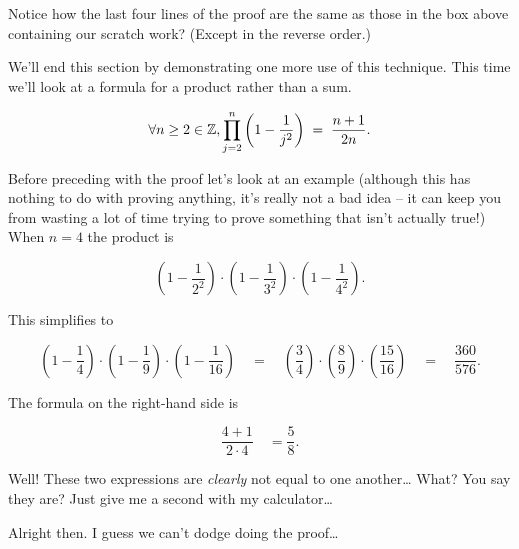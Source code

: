 Notice how the last four lines of the proof are the same as those in
the box above containing our scratch work?  (Except in the reverse order.)

We'll end this section by demonstrating one more use of this technique.
This time we'll look at a formula for a product rather than a sum.

\begin{thm} $$\forall n \geq 2 \in {\mathbb Z}, \prod_{j=2}^n \left( 1 - \frac{1}{j^2} \right) \;  = \; \frac{n+1}{2n}. $$
\end{thm}

Before preceding with the proof let's look at an example (although this 
has nothing to do with proving anything, it's really not a bad idea -- it can
keep you from wasting a lot of time trying to prove something that isn't 
actually true!)  When $n = 4$ the product is

\[  \left(1-\frac{1}{2^2}\right) \cdot \left(1-\frac{1}{3^2}\right) \cdot \left(1-\frac{1}{4^2}\right). 
\]

This simplifies to

\[ \left( 1-\frac{1}{4} \right) \cdot \left( 1-\frac{1}{9} \right) \cdot 
\left( 1-\frac{1}{16} \right) \quad = \quad \left( \frac{3}{4} \right) \cdot \left( \frac{8}{9} \right) \cdot \left( \frac{15}{16} \right) \quad = \quad \frac{360}{576}.
\]

The formula on the right-hand side is 

\[ \frac{4+1}{2 \cdot 4} \quad = \frac{5}{8}. \]

Well!  These two expressions are \emph{clearly} not equal to one another\ldots
What?  You say they are?  Just give me a second with my calculator\ldots

Alright then.  I guess we can't dodge doing the proof\ldots

